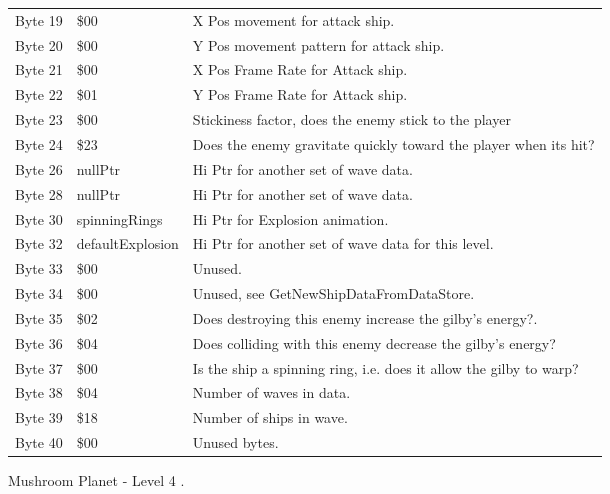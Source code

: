 \begin{figure}[H]
{\begin{adjustbox}{width=12cm}
\begin{tabular}{lll}
 Byte 19 & \$00                       & X Pos movement for attack ship.                                    \\
 Byte 20 & \$00                       & Y Pos movement pattern for attack ship.                            \\
 Byte 21 & \$00                       & X Pos Frame Rate for Attack ship.                                  \\
 Byte 22 & \$01                       & Y Pos Frame Rate for Attack ship.                                  \\
 Byte 23 & \$00                       & Stickiness factor, does the enemy stick to the player              \\
 Byte 24 & \$23                       & Does the enemy gravitate quickly toward the player when its hit?   \\
 Byte 26 & nullPtr                   & Hi Ptr for another set of wave data.                               \\
 Byte 28 & nullPtr                   & Hi Ptr for another set of wave data.                               \\
 Byte 30 & spinningRings             & Hi Ptr for Explosion animation.                                    \\
 Byte 32 & defaultExplosion          & Hi Ptr for another set of wave data for this level.                \\
 Byte 33 & \$00                       & Unused.                                                            \\
 Byte 34 & \$00                       & Unused, see GetNewShipDataFromDataStore.                           \\
 Byte 35 & \$02                       & Does destroying this enemy increase the gilby's energy?.           \\
 Byte 36 & \$04                       & Does colliding with this enemy decrease the gilby's energy?        \\
 Byte 37 & \$00                       & Is the ship a spinning ring, i.e. does it allow the gilby to warp? \\
 Byte 38 & \$04                       & Number of waves in data.                                           \\
 Byte 39 & \$18                       & Number of ships in wave.                                           \\
 Byte 40 & \$00                       & Unused bytes.                                                      \\
\bottomrule
\end{tabular}

  \end{adjustbox}

  }\caption*{Mushroom Planet - Level 4
.}
\end{figure}

